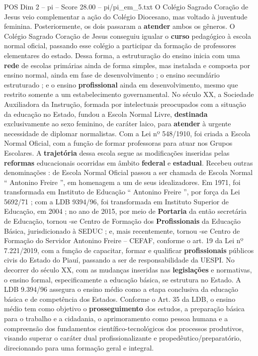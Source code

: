\begin{textsample}{POS Dim 2 – pi – Score 28.00 – pi/pi\_em\_5.txt}
O Colégio Sagrado Coração de Jesus veio complementar a ação do Colégio Diocesano, mas voltado à juventude feminina.
Posteriormente, os dois passaram a \textbf{atender} ambos os gêneros.
O Colégio Sagrado Coração de Jesus conseguiu igualar o \textbf{curso} pedagógico à escola normal oficial, passando esse colégio a participar da formação de professores elementares do estado.
Dessa forma, a estruturação do ensino inicia com uma \textbf{rede} de escolas primárias ainda de forma simples, mas instalada e composta por ensino normal, ainda em fase de desenvolvimento ; o ensino secundário estruturado ; e o ensino \textbf{profissional} ainda em desenvolvimento, mesmo que restrito somente a um estabelecimento governamental.
No século XX, a Sociedade Auxiliadora da Instrução, formada por intelectuais preocupados com a situação da educação no Estado, fundou a Escola Normal Livre, \textbf{destinada} exclusivamente ao sexo feminino, de caráter laico, para \textbf{atender} à urgente necessidade de diplomar normalistas.
Com a Lei nº 548/1910, foi criada a Escola Normal Oficial, com a função de formar professoras para atuar nos Grupos Escolares.
A \textbf{trajetória} dessa escola segue as modificações inseridas pelas \textbf{reformas} educacionais ocorridas em âmbito \textbf{federal} e \textbf{estadual}.
Recebeu outras denominações : de Escola Normal Oficial passou a ser chamada de Escola Normal “ Antonino Freire ”, em homenagem a um de seus idealizadores.
Em 1971, foi transformada em Instituto de Educação “ Antonino Freire ”, por força da Lei 5692/71 ; com a LDB 9394/96, foi transformada em Instituto Superior de Educação, em 2004 ; no ano de 2015, por meio de \textbf{Portaria} da então secretária de Educação, tornou -se Centro de Formação dos \textbf{Profissionais} da Educação Básica, jurisdicionado à SEDUC ; e, mais recentemente, tornou -se Centro de Formação do Servidor Antonino Freire – CEFAF, conforme o art. 19 da Lei nº 7.221/2019, com a função de capacitar, formar e qualificar \textbf{profissionais} públicos civis do Estado do Piauí, passando a ser de responsabilidade da UESPI.
No decorrer do século XX, com as mudanças inseridas nas \textbf{legislações} e normativas, o ensino formal, especificamente a educação básica, se estrutura no Estado.
A LDB 9.394/96 assegura o ensino médio como a etapa conclusiva da educação básica e de competência dos Estados.
Conforme o Art. 35 da LDB, o ensino médio tem como objetivo o \textbf{prosseguimento} dos estudos, a preparação básica para o trabalho e a cidadania, o aprimoramento como pessoa humana e a compreensão dos fundamentos científico-tecnológicos dos processos produtivos, visando superar o caráter dual profissionalizante e propedêutico/preparatório, direcionando para uma formação geral e integral.

\end{textsample}
